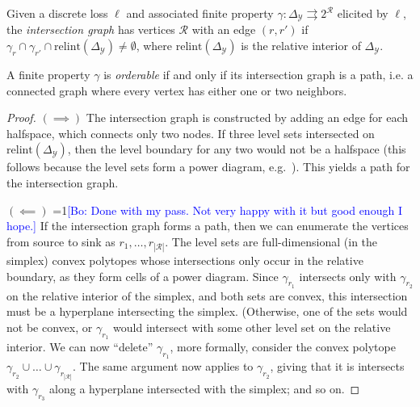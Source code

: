 \documentclass[anon]{colt2020} %
\newcommand{\Comments}{1}
\newcommand{\mynote}[2]{\ifnum\Comments=1\textcolor{#1}{#2}\fi}
\newcommand{\bo}[1]{\mynote{blue}{[Bo: #1]}}
\newcommand{\relint}{\mathrm{relint}}
\newcommand{\simplex}{\Delta_\Y}
\newcommand{\R}{\mathcal{R}}
\newcommand{\Y}{\mathcal{Y}}
\newcommand{\toto}{\rightrightarrows}
\begin{document}
\begin{definition}\label{def:intersection-graph}
  Given a discrete loss $\ell$ and associated finite property $\gamma: \simplex \toto 2^{\R}$ elicited by $\ell$, the \emph{intersection graph} has vertices $\R$ with an edge $(r,r')$ if $\gamma_r \cap \gamma_{r'} \cap \relint(\simplex) \neq \emptyset$, where $\relint(\simplex)$ is the relative interior of $\simplex$.
\end{definition}
\begin{proposition} \label{prop:orderable-iff-path}
  A finite property $\gamma$ is \emph{orderable} if and only if its intersection graph is a path, i.e. a connected graph where every vertex has either one or two neighbors.
\end{proposition}
\begin{proof}
  $(\implies)$
  The intersection graph is constructed by adding an edge for each halfspace, which connects only two nodes.
  If three level sets intersected on $\relint(\simplex)$, then the level boundary for any two would not be a halfspace (this follows because the level sets form a power diagram, e.g.~\cite{lambert2009eliciting}).
  This yields a path for the intersection graph.
  

  $(\impliedby)$
  \bo{Done with my pass. Not very happy with it but good enough I hope.}
  If the intersection graph forms a path, then we can enumerate the vertices from source to sink as $r_1,\ldots,r_{|\R|}$.
  The level sets are full-dimensional (in the simplex) convex polytopes whose intersections only occur in the relative boundary, as they form cells of a power diagram.
  Since $\gamma_{r_1}$ intersects only with $\gamma_{r_2}$ on the relative interior of the simplex, and both sets are convex, this intersection must be a hyperplane intersecting the simplex.
  (Otherwise, one of the sets would not be convex, or $\gamma_{r_1}$ would intersect with some other level set on the relative interior.
  We can now ``delete'' $\gamma_{r_1}$, more formally, consider the convex polytope $\gamma_{r_2} \cup \ldots \cup \gamma_{r_{|\R|}}$.
  The same argument now applies to $\gamma_{r_2}$, giving that it is intersects with $\gamma_{r_3}$ along a hyperplane intersected with the simplex; and so on.
%
\end{proof}
\end{document}
